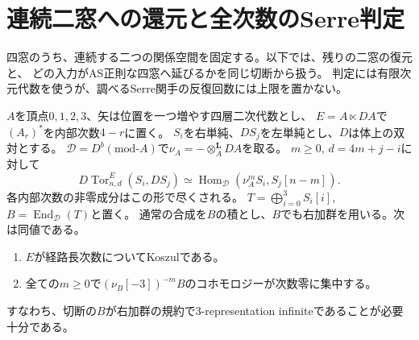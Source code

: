 \section{連続二窓への還元と全次数のSerre判定}
\label{sec:cut-serre}
四窓のうち、連続する二つの関係空間を固定する。以下では、残りの二窓の復元と、
どの入力がAS正則な四窓へ延びるかを同じ切断から扱う。
判定には有限次元代数を使うが、調べるSerre関手の反復回数には上限を置かない。

\begin{theorem}[戻り回数別のTorとSerre反復]\label{thm:cut-serre}
$A$を頂点$0,1,2,3$、矢は位置を一つ増やす四層二次代数とし、
$E=A\ltimes DA$で$(A_r)^*$を内部次数$4-r$に置く。
$S_i$を右単純、$D S_j$を左単純とし、$D$は体上の双対とする。
$\mathcal D=D^b(\mathrm{mod}\text{-}A)$で$\nu_A=-\otimes_A^{\mathbf L}DA$を取る。
$m\geq0$, $d=4m+j-i$に対して
\[
 D\operatorname{Tor}^E_{n,d}(S_i,D S_j)
 \simeq\operatorname{Hom}_{\mathcal D}(\nu_A^m S_i,S_j[n-m]).
\]
各内部次数の非零成分はこの形で尽くされる。
$T=\bigoplus_{i=0}^3 S_i[i]$, $B=\operatorname{End}_{\mathcal D}(T)$と置く。
通常の合成を$B$の積とし、$B$でも右加群を用いる。次は同値である。
\begin{enumerate}
\item $E$が経路長次数についてKoszulである。
\item 全ての$m\geq0$で$(\nu_B[-3])^{-m}B$のコホモロジーが次数零に集中する。
\end{enumerate}
すなわち、切断の$B$が右加群の規約で3-representation infiniteであることが必要十分である。
\end{theorem}

